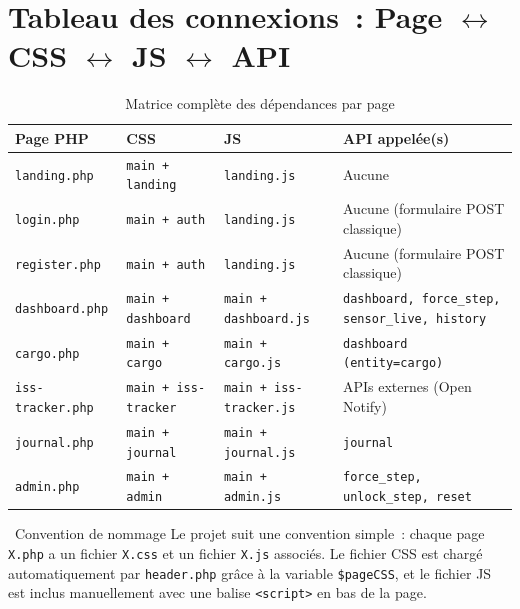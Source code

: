 \documentclass[12pt,a4paper]{article}
\begin{document}
\section{Tableau des connexions~: Page $\leftrightarrow$ CSS $\leftrightarrow$ JS $\leftrightarrow$ API}

\begin{table}[h!]
\centering
\small
\begin{tabularx}{\textwidth}{lllX}
    \toprule
    \textbf{Page PHP} & \textbf{CSS} & \textbf{JS} & \textbf{API appelée(s)} \\
    \midrule
    \texttt{landing.php} & \texttt{main + landing} & \texttt{landing.js} & Aucune \\
    \texttt{login.php} & \texttt{main + auth} & \texttt{landing.js} & Aucune (formulaire POST classique) \\
    \texttt{register.php} & \texttt{main + auth} & \texttt{landing.js} & Aucune (formulaire POST classique) \\
    \texttt{dashboard.php} & \texttt{main + dashboard} & \texttt{main + dashboard.js} & \texttt{dashboard, force\_step, sensor\_live, history} \\
    \texttt{cargo.php} & \texttt{main + cargo} & \texttt{main + cargo.js} & \texttt{dashboard (entity=cargo)} \\
    \texttt{iss-tracker.php} & \texttt{main + iss-tracker} & \texttt{main + iss-tracker.js} & APIs externes (Open Notify) \\
    \texttt{journal.php} & \texttt{main + journal} & \texttt{main + journal.js} & \texttt{journal} \\
    \texttt{admin.php} & \texttt{main + admin} & \texttt{main + admin.js} & \texttt{force\_step, unlock\_step, reset} \\
    \bottomrule
\end{tabularx}
\caption{Matrice complète des dépendances par page}
\end{table}

\begin{tipbox}{\faLightbulb\ Convention de nommage}
Le projet suit une convention simple~: chaque page \texttt{X.php} a un fichier \texttt{X.css} et un fichier \texttt{X.js} associés. Le fichier CSS est chargé automatiquement par \texttt{header.php} grâce à la variable \texttt{\$pageCSS}, et le fichier JS est inclus manuellement avec une balise \texttt{<script>} en bas de la page.
\end{tipbox}
\end{document}
